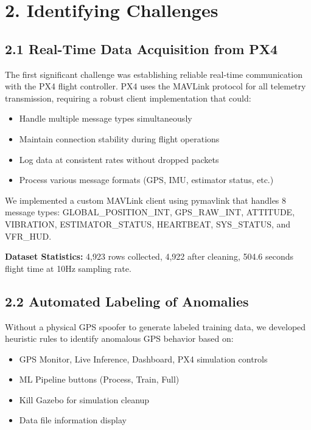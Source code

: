 \section{2. Identifying Challenges}

\subsection{2.1 Real-Time Data Acquisition from PX4}

The first significant challenge was establishing reliable real-time communication with the PX4 flight controller. PX4 uses the MAVLink protocol for all telemetry transmission, requiring a robust client implementation that could:

\begin{itemize}
    \item Handle multiple message types simultaneously
    \item Maintain connection stability during flight operations
    \item Log data at consistent rates without dropped packets
    \item Process various message formats (GPS, IMU, estimator status, etc.)
\end{itemize}

We implemented a custom MAVLink client using pymavlink that handles 8 message types: GLOBAL\_POSITION\_INT, GPS\_RAW\_INT, ATTITUDE, VIBRATION, ESTIMATOR\_STATUS, HEARTBEAT, SYS\_STATUS, and VFR\_HUD.

\textbf{Dataset Statistics:} 4,923 rows collected, 4,922 after cleaning, 504.6 seconds flight time at 10Hz sampling rate.
\vspace{0.5cm}

\subsection{2.2 Automated Labeling of Anomalies}

Without a physical GPS spoofer to generate labeled training data, we developed heuristic rules to identify anomalous GPS behavior based on:

\begin{itemize}
    \item GPS Monitor, Live Inference, Dashboard, PX4 simulation controls
    \item ML Pipeline buttons (Process, Train, Full)
    \item Kill Gazebo for simulation cleanup
    \item Data file information display
\end{itemize}

